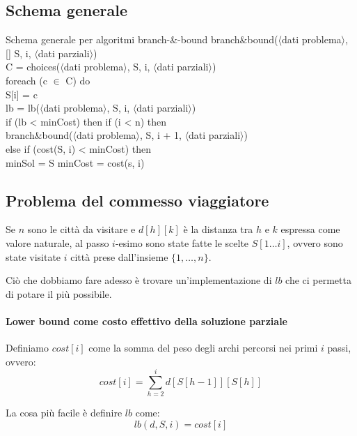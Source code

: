 \subsection{Schema generale}
\begin{minicode}{Schema generale per algoritmi branch-\&-bound}
\ind branch\&bound($\langle$dati problema$\rangle$, [] S,  i, $\langle$dati parziali$\rangle$)\\
     C = choices($\langle$dati problema$\rangle$, S, i, $\langle$dati parziali$\rangle$)\\
    \indf foreach (c $\in$ C) do\\
        S[i] = c\\
         lb = lb($\langle$dati problema$\rangle$, S, i, $\langle$dati parziali$\rangle$)\\
        \indff if (lb < minCost) then\hfill{}
            \indfff if (i < n) then\\
                branch\&bound($\langle$dati problema$\rangle$, S, i + 1, $\langle$dati parziali$\rangle$)\\
            \indfff else\hfill{}
                \indffff if (cost(S, i) < minCost) then\\
                    minSol = S\hfill{}
                    minCost = cost(s, i)\hfill{}
\end{minicode}

\subsection{Problema del commesso viaggiatore}
Se $n$ sono le città da visitare e $d[h][k]$ è la distanza tra $h$ e $k$ espressa
come valore naturale, al passo $i$-esimo sono state fatte le scelte $S[1\dots i]$,
ovvero sono state visitate $i$ città prese dall'insieme $\{1,\dots,n\}$.

\bigskip\noindent
Ciò che dobbiamo fare adesso è trovare un'implementazione di $lb$ che ci
permetta di potare il più possibile.

\paragraph{Lower bound come costo effettivo della soluzione parziale}
\begin{definition}
    Definiamo $cost[i]$ come la somma del peso degli archi percorsi nei primi
    $i$ passi, ovvero:
    \[cost[i]=\sum_{h=2}^id[S[h-1]][S[h]]\]
\end{definition}
\noindent
La cosa più facile è definire $lb$ come:
\[lb(d,S,i)=cost[i]\]

